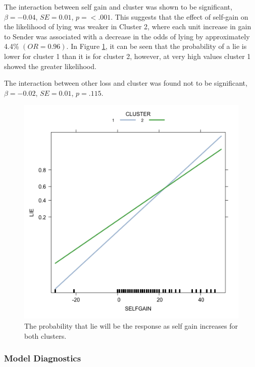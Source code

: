 \documentclass[man, floatsintext]{apa7}
\begin{document}
The interaction between self gain and cluster was shown to be significant, $\beta = -0.04$, $SE = 0.01$, $p = < .001$. This suggests that the effect of self-gain on the likelihood of lying was weaker in Cluster 2, where each unit increase in gain to Sender was associated with a decrease in the odds of lying by approximately 4.4\% $(OR=0.96)$. In Figure \ref{fig:InteractionEffects}, it can be seen that the probability of a lie is lower for cluster 1 than it is for cluster 2, however, at very high values cluster 1 showed the greater likelihood.

The interaction between other loss and cluster was found not to be significant, $\beta = -0.02$, $SE = 0.01$, $p = .115$.


\begin{figure}[H]
	\centering
	\includegraphics[width=0.75\linewidth]{../plots/R_selfgain/effects.png}
	\caption{The probability that lie will be the response as self gain increases for both clusters.}
	\label{fig:InteractionEffects}
\end{figure}

\subsubsection{Model Diagnostics}
\end{document}
